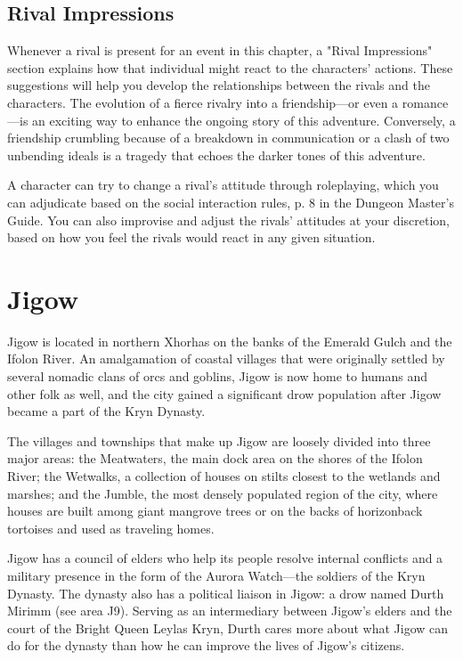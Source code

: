 \documentclass[letterpaper, 11pt, bg=full, twocolumn]{dndbook}
\begin{document}
\subsection{Rival Impressions}

Whenever a rival is present for an event in this chapter, a "Rival Impressions" section explains how that individual might react to the characters' actions. These suggestions will help you develop the relationships between the rivals and the characters. The evolution of a fierce rivalry into a friendship---or even a romance---is an exciting way to enhance the ongoing story of this adventure. Conversely, a friendship crumbling because of a breakdown in communication or a clash of two unbending ideals is a tragedy that echoes the darker tones of this adventure.

A character can try to change a rival's attitude through roleplaying, which you can adjudicate based on the social interaction rules, p. 8 in the Dungeon Master's Guide. You can also improvise and adjust the rivals' attitudes at your discretion, based on how you feel the rivals would react in any given situation.
\section{Jigow}

Jigow is located in northern Xhorhas on the banks of the Emerald Gulch and the Ifolon River. An amalgamation of coastal villages that were originally settled by several nomadic clans of orcs and goblins, Jigow is now home to humans and other folk as well, and the city gained a significant drow population after Jigow became a part of the Kryn Dynasty.

The villages and townships that make up Jigow are loosely divided into three major areas: the Meatwaters, the main dock area on the shores of the Ifolon River; the Wetwalks, a collection of houses on stilts closest to the wetlands and marshes; and the Jumble, the most densely populated region of the city, where houses are built among giant mangrove trees or on the backs of horizonback tortoises and used as traveling homes.

Jigow has a council of elders who help its people resolve internal conflicts and a military presence in the form of the Aurora Watch---the soldiers of the Kryn Dynasty. The dynasty also has a political liaison in Jigow: a drow named Durth Mirimm (see area J9). Serving as an intermediary between Jigow's elders and the court of the Bright Queen Leylas Kryn, Durth cares more about what Jigow can do for the dynasty than how he can improve the lives of Jigow's citizens.
\end{document}
